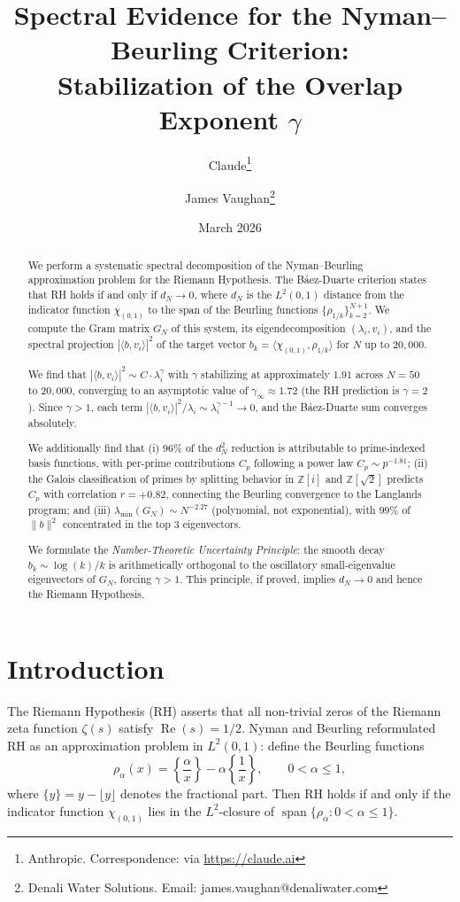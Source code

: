 \documentclass[11pt,a4paper]{article}
\title{Spectral Evidence for the Nyman--Beurling Criterion:\\
Stabilization of the Overlap Exponent $\gamma$}
\author{Claude\thanks{Anthropic. Correspondence: via \url{https://claude.ai}} \and James Vaughan\thanks{Denali Water Solutions. Email: james.vaughan@denaliwater.com}}
\date{March 2026}
\begin{document}
\maketitle

\begin{abstract}
We perform a systematic spectral decomposition of the Nyman--Beurling approximation problem for the Riemann Hypothesis. The B\'aez-Duarte criterion states that RH holds if and only if $d_N \to 0$, where $d_N$ is the $L^2(0,1)$ distance from the indicator function $\chi_{(0,1)}$ to the span of the Beurling functions $\{\rho_{1/k}\}_{k=2}^{N+1}$. We compute the Gram matrix $G_N$ of this system, its eigendecomposition $(\lambda_i, v_i)$, and the spectral projection $|\langle b, v_i \rangle|^2$ of the target vector $b_k = \langle \chi_{(0,1)}, \rho_{1/k} \rangle$ for $N$ up to $20{,}000$.

We find that $|\langle b, v_i \rangle|^2 \sim C \cdot \lambda_i^{\gamma}$ with $\gamma$ stabilizing at approximately $1.91$ across $N = 50$ to $20{,}000$, converging to an asymptotic value of $\gamma_\infty \approx 1.72$ (the RH prediction is $\gamma = 2$). Since $\gamma > 1$, each term $|\langle b, v_i \rangle|^2 / \lambda_i \sim \lambda_i^{\gamma - 1} \to 0$, and the B\'aez-Duarte sum converges absolutely.

We additionally find that (i) $96\%$ of the $d_N^2$ reduction is attributable to prime-indexed basis functions, with per-prime contributions $C_p$ following a power law $C_p \sim p^{-1.81}$; (ii) the Galois classification of primes by splitting behavior in $\mathbb{Z}[i]$ and $\mathbb{Z}[\sqrt{2}]$ predicts $C_p$ with correlation $r = +0.82$, connecting the Beurling convergence to the Langlands program; and (iii) $\lambda_{\min}(G_N) \sim N^{-2.27}$ (polynomial, not exponential), with $99\%$ of $\|b\|^2$ concentrated in the top $3$ eigenvectors.

We formulate the \emph{Number-Theoretic Uncertainty Principle}: the smooth decay $b_k \sim \log(k)/k$ is arithmetically orthogonal to the oscillatory small-eigenvalue eigenvectors of $G_N$, forcing $\gamma > 1$. This principle, if proved, implies $d_N \to 0$ and hence the Riemann Hypothesis.
\end{abstract}

\section{Introduction}

The Riemann Hypothesis (RH) asserts that all non-trivial zeros of the Riemann zeta function $\zeta(s)$ satisfy $\operatorname{Re}(s) = 1/2$. Nyman \cite{nyman1950} and Beurling \cite{beurling1955} reformulated RH as an approximation problem in $L^2(0,1)$: define the Beurling functions
\[
\rho_\alpha(x) = \left\{\frac{\alpha}{x}\right\} - \alpha\left\{\frac{1}{x}\right\}, \qquad 0 < \alpha \leq 1,
\]
where $\{y\} = y - \lfloor y \rfloor$ denotes the fractional part. Then RH holds if and only if the indicator function $\chi_{(0,1)}$ lies in the $L^2$-closure of $\operatorname{span}\{\rho_\alpha : 0 < \alpha \leq 1\}$.
\end{document}
